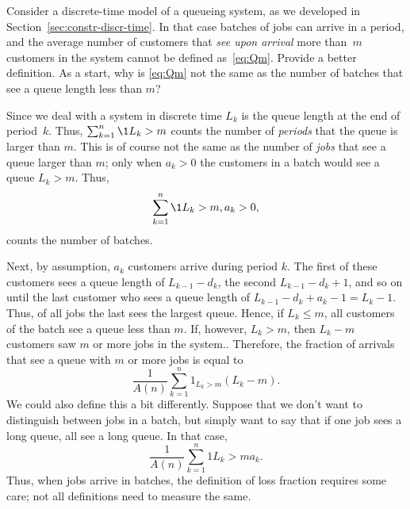\begin{question}
  Consider a discrete-time model of a queueing system, as we developed
  in Section~\ref{sec:constr-discr-time}.  In that case batches of
  jobs can arrive in a period, and the average number of customers
  that \emph{see upon arrival} more than~$m$ customers in the system
  cannot be defined as~\eqref{eq:Qm}. Provide a better definition. As
  a start, why is \eqref{eq:Qm} not the same as the number of
  batches that see a queue length less than $m$?

  \begin{solution} Since we deal with a system in discrete time $L_k$
    is the queue length at the end of period~$k$. Thus,
    $\sum_{k=1}^n \1{L_k > m}$ counts the number of \emph{periods}
    that the queue is larger than $m$. This is of course not the same
    as the number of \emph{jobs} that see a queue larger than $m$;
    only when $a_k>0$ the customers in a batch would see a queue
    $L_k>m$. Thus,
    \begin{equation*}
      \sum_{k=1}^n \1{L_k > m, a_k > 0},
    \end{equation*}
    counts the number of batches. 

    Next, by assumption, $a_k$ customers arrive during period $k$. The
    first of these customers sees a queue length of $L_{k-1} - d_k$,
    the second $L_{k-1}-d_k + 1$, and so on until the last customer
    who sees a queue length of $L_{k-1} - d_k + a_k -1 = L_k
    -1$.
    Thus, of all jobs the last sees the largest queue. Hence, if
    $L_k \leq m$, all customers of the batch see a queue less than
    $m$. If, however, $L_k > m$, then $L_k -m$ customers saw $m$ or
    more jobs in the system.. Therefore, the fraction of arrivals that
    see a queue with $m$ or more jobs is equal to
\begin{equation*}
  \frac 1{A(n)} \sum_{k=1}^n 1_{L_k > m} (L_k - m).
\end{equation*}
We could also define this a bit differently. Suppose that we don't
want to distinguish between jobs in a batch, but simply want to say
that if one job sees a long queue, all see a long queue. In that case,
\begin{equation*}
\frac 1{A(n)}\sum_{k=1}^n 1{L_k > m} a_k .
\end{equation*}
Thus, when jobs arrive in batches, the definition of loss fraction
requires some care; not all definitions need to measure the same.
  \end{solution}
\end{question}




